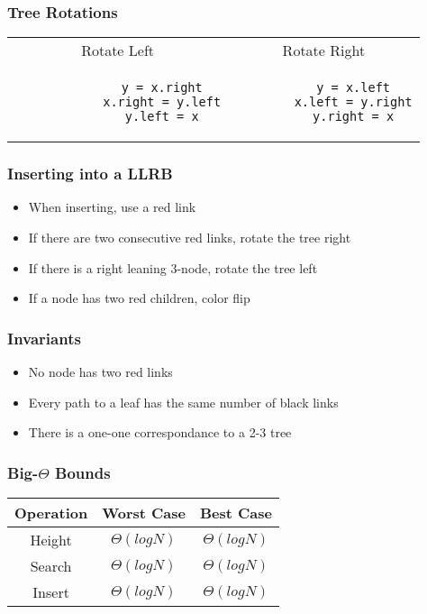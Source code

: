 \documentclass{article}
\begin{document}
\subsubsection{Tree Rotations}
\begin{center}
    \begin{tabular}{ c c }
        Rotate Left & Rotate Right\\
        \begin{lstlisting}
            y = x.right
            x.right = y.left
            y.left = x
        \end{lstlisting} &
    \begin{lstlisting}
        y = x.left
        x.left = y.right
        y.right = x
    \end{lstlisting}
    \end{tabular}
\end{center}

\subsubsection{Inserting into a LLRB}
\begin{itemize}
    \item When inserting, use a red link
    \item If there are two consecutive red links, rotate the tree right
    \item If there is a right leaning 3-node, rotate the tree left
    \item If a node has two red children, color flip
\end{itemize}
\subsubsection{Invariants}
\begin{itemize}
    \item No node has two red links
    \item Every path to a leaf has the same number of black links
    \item There is a one-one correspondance to a 2-3 tree
\end{itemize}
\subsubsection{Big-$\Theta$ Bounds}
\begin{center}
    \begin{tabular}{ c | c | c }
     Operation & Worst Case & Best Case\\
     \hline
     Height & $\Theta(log N)$ & $\Theta(log N)$ \\ 
     Search & $\Theta(log N)$ & $\Theta(log N)$ \\  
     Insert & $\Theta(log N)$ & $\Theta(log N)$  
    \end{tabular}
\end{center}
\end{document}
